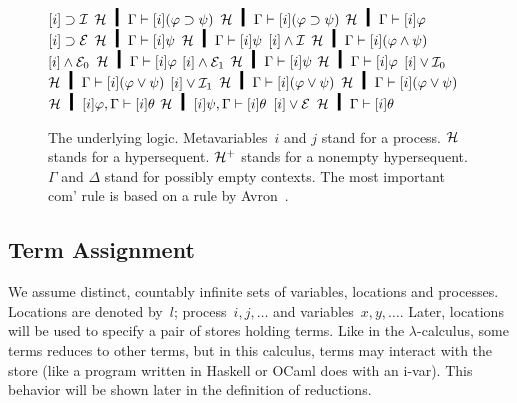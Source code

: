 {\begin{figure}
\begin{center}
  {$[i]\supset\mathcal I$}
  {$\hyper\hmid\Gamma\vdash [i](\varphi\supset \psi)$}
  \hfill
  \BinaryRule
  {$\hyper\hmid\Gamma\vdash [i](\varphi\supset\psi)$}
  {$\hyper\hmid\Gamma\vdash [i]\varphi$}
  {$[i]\supset\mathcal E$}
  {$\hyper\hmid\Gamma\vdash [i]\psi$}
   \vskip 2mm
  \BinaryRule{$\hyper\hmid\Gamma\vdash [i]\varphi$}
   {$\hyper\hmid\Gamma\vdash [i]\psi$}
   {$[i]\wedge\mathcal I$}
   {$\hyper\hmid\Gamma\vdash [i](\varphi\wedge\psi)$}
   \vskip 2mm
  \UnaryRule{$\hyper\hmid\Gamma\vdash [i](\varphi\wedge\psi)$}
   {$[i]\wedge\mathcal E_0$}
   {$\hyper\hmid\Gamma\vdash[i]\varphi$}
   \hfill
  \UnaryRule{$\hyper\hmid\Gamma\vdash[i](\varphi\wedge\psi)$}
   {$[i]\wedge\mathcal E_1$}
   {$\hyper\hmid\Gamma\vdash[i]\psi$}
\vskip 2mm
  \UnaryRule
   {$\hyper\hmid\Gamma\vdash[i]\varphi$}
   {$[i]\vee\mathcal I_0$}
   {$\hyper\hmid\Gamma\vdash[i](\varphi\vee\psi)$}
   \hfill
  \UnaryRule{$\hyper\hmid\Gamma\vdash[i]\psi$}
   {$[i]\vee\mathcal I_1$}
   {$\hyper\hmid\Gamma\vdash[i](\varphi\vee\psi)$}
\vskip 2mm
   \TrinaryRule
   {$\hyper\hmid\Gamma\vdash[i](\varphi\vee\psi)$}
   {$\hyper\hmid[i]\varphi, \Gamma\vdash[i]\theta$}
   {$\hyper\hmid[i]\psi,    \Gamma\vdash[i]\theta$}
   {$[i]\vee\mathcal E$}
   {$\hyper\hmid         \Gamma\vdash[i]\theta$}
\vskip 2mm
\end{center}
\caption[The underlying logic .]
 {The underlying logic.
 Metavariables~$i$ and $j$ stand for a process.
 $\mathcal{H}$ stands for a
 hypersequent.
 $\mathcal{H}^+$ stands for a nonempty hypersequent.
 $\Gamma$ and $\Delta$ stand for possibly empty contexts.
 The most important com' rule is based on a rule by
 Avron~\cite{avron96}.
 }
\label{fig:logic}
\end{figure}

\subsection{Term Assignment}
\label{term}

We assume distinct, countably infinite sets of variables,
locations
and
processes.
Locations are denoted by~$l$; process~$i,j, \ldots$ and variables~$x,
y, \ldots$.
Later, locations will be used to specify a pair of stores
holding terms.
Like in the $\lambda$-calculus, some terms reduces to other
terms, but in this calculus, terms may interact with the store (like
a program written in Haskell or OCaml does with an i-var).
This behavior will be shown later in the definition of reductions.

}
